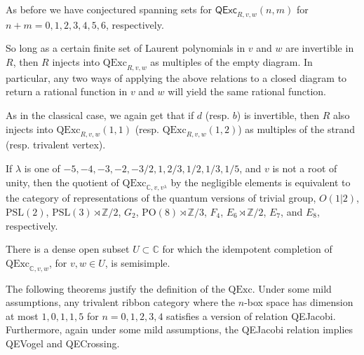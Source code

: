 \documentclass[12pt]{amsart}
\begin{document}
As before we have conjectured spanning sets for $\mathsf{QExc}_{R,v,w}(n,m)$ for $n+m=0,1,2,3,4,5,6$, respectively.

\begin{conjecture}
  \label{conj:quant-consist}
So long as a certain finite set of Laurent polynomials in $v$ and $w$ are invertible in $R$, then $R$ injects into $\mathrm{QExc}_{R,v,w}$ as multiples of the empty diagram.  In particular, any two ways of applying the above relations to a closed diagram to return a rational function in $v$ and $w$ will yield the same rational function.
\end{conjecture}

As in the classical case, we again get that if $d$ (resp. $b$) is invertible, then $R$ also injects into $\mathrm{QExc}_{R,v,w}(1,1)$ (resp. $\mathrm{QExc}_{R,v,w}(1,2)$) as multiples of the strand (resp. trivalent vertex).

\begin{conjecture}
If $\lambda$ is one of $-5, -4, -3, -2, -3/2,1,2/3,1/2, 1/3, 1/5$, and $v$ is not a root of unity, then the quotient of $\mathrm{QExc}_{\mathbb{C},v,v^\lambda}$ by the negligible elements is equivalent to the category of representations of the quantum versions of trivial group, $O(1 | 2)$, $\mathrm{PSL}(2)$, $\mathrm{PSL}(3) \rtimes \mathbb{Z}/2$, $G_2$, $\mathrm{PO}(8) \rtimes \mathbb{Z}/3$, $F_4$, $E_6 \rtimes \mathbb{Z}/2$, $E_7$, and $E_8$, respectively.
\end{conjecture}





\begin{conjecture}
There is a dense open subset $U \subset \mathbb{C}$ for which the idempotent completion of $\mathrm{QExc}_{\mathbb{C},v,w}$, for $v,w \in U$, is semisimple.
\end{conjecture}



The following theorems justify the definition of the $\mathrm{QExc}$.  Under some mild assumptions, any trivalent ribbon category where the $n$-box space has dimension at most $1,0,1,1,5$ for $n=0,1,2,3,4$ satisfies a version of relation QEJacobi.  Furthermore, again under some mild assumptions, the QEJacobi relation implies QEVogel and QECrossing.
\end{document}
